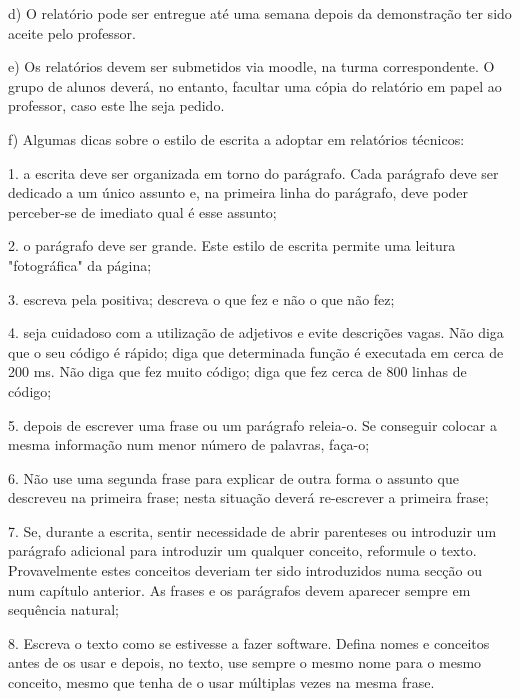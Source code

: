 \documentclass[article, a4paper, 11pt, oneside]{memoir}
\begin{document}
d) O relatório pode ser entregue até uma semana depois da demonstração ter sido aceite pelo professor.


e) Os relatórios devem ser submetidos via moodle, na turma correspondente. O grupo de alunos deverá, no entanto, facultar uma cópia do relatório em papel ao professor, caso este lhe seja pedido.


f) Algumas dicas sobre o estilo de escrita a adoptar em relatórios técnicos:


1. a escrita deve ser organizada em torno do parágrafo.
  Cada parágrafo deve ser dedicado a um único assunto e,
  na primeira linha do parágrafo, deve poder perceber-se
  de imediato qual é esse assunto;

2. o parágrafo deve ser grande. Este estilo de escrita permite
  uma leitura "fotográfica" da página;

3. escreva pela positiva; descreva o que fez e não o que não fez;

4. seja cuidadoso com a utilização de adjetivos e evite
  descrições vagas.  Não diga que  o seu código é rápido; diga
  que determinada função é executada em cerca de 200 ms. Não diga
  que fez muito código; diga que fez cerca de 800 linhas de código;

5. depois de escrever uma frase ou um parágrafo releia-o. Se
  conseguir colocar a mesma informação num menor número de
  palavras, faça-o;

6. Não use uma segunda frase para explicar de outra forma o assunto
  que descreveu na primeira frase; nesta situação deverá re-escrever
  a primeira frase;

7. Se, durante a escrita, sentir necessidade de abrir parenteses ou
  introduzir um parágrafo adicional para introduzir um qualquer
  conceito, reformule o texto. Provavelmente estes conceitos deveriam
  ter sido introduzidos numa secção ou num capítulo anterior. As frases e
  os parágrafos devem aparecer sempre em sequência natural;

8. Escreva o texto como se estivesse a fazer software. Defina nomes
    e conceitos antes de os usar e depois, no texto, use sempre o mesmo nome
  para o mesmo conceito, mesmo que tenha de o usar múltiplas vezes na
  mesma frase.
  
\end{document}
